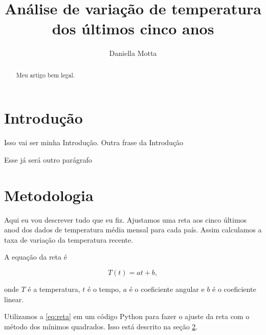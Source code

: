 \documentclass{article}
\begin{document}
\title{Análise de variação de temperatura dos últimos cinco anos}
\author{Daniella Motta}

\maketitle
\begin{abstract}
    Meu artigo bem legal.
\end{abstract}


\section{Introdução}
Isso vai ser minha Introdução.
Outra frase da Introdução

Esse já será outro parágrafo

\section{Metodologia}
\label{sec:metodos}

Aqui eu vou descrever tudo que eu fiz.
Ajustamos uma reta aos cinco últimos anod dos dados
de temperatura média mensal para cada país.
Assim calculamos a taxa de variação da temperatura recente.

A equação da reta é

\begin{equation}
T(t) = a t + b,
\label{eq:reta}
\end{equation}

\noindent
onde  $T$ é a temperatura, $t$ é o tempo, $a$ é o coeficiente angular e $b$ é o coeficiente linear.

Utilizamos a \ref{eq:reta} em um código Python para fazer o ajuste da reta com o método dos mínimos quadrados.
Isso está descrito na seção \ref{sec:metodos}.
\end{document}
